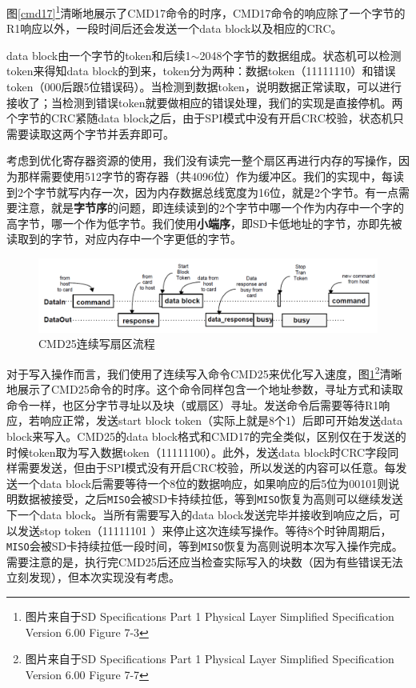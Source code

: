 \documentclass[11pt,utf8]{report}
\begin{document}
	\par 图\ref{cmd17}\footnote{图片来自于SD Specifications Part 1 Physical Layer Simplified Specification Version 6.00 Figure 7-3}清晰地展示了CMD17命令的时序，CMD17命令的响应除了一个字节的R1响应以外，一段时间后还会发送一个data block以及相应的CRC。
	
	\par data block由一个字节的token和后续1$\sim$2048个字节的数据组成。状态机可以检测token来得知data block的到来，token分为两种：数据token（11111110）和错误token（000后跟5位错误码）。当检测到数据token，说明数据正常读取，可以进行接收了；当检测到错误token就要做相应的错误处理，我们的实现是直接停机。两个字节的CRC紧随data block之后，由于SPI模式中没有开启CRC校验，状态机只需要读取这两个字节并丢弃即可。
	
	\par 考虑到优化寄存器资源的使用，我们没有读完一整个扇区再进行内存的写操作，因为那样需要使用512字节的寄存器（共4096位）作为缓冲区。我们的实现中，每读到2个字节就写内存一次，因为内存数据总线宽度为16位，就是2个字节。有一点需要注意，就是\textbf{字节序}的问题，即连续读到的2个字节中哪一个作为内存中一个字的高字节，哪一个作为低字节。我们使用\textbf{小端序}，即SD卡低地址的字节，亦即先被读取到的字节，对应内存中一个字更低的字节。
	
	\begin{figure}[h!]
		\centering
		\includegraphics[width=\textwidth]{cmd25}
		\caption{CMD25连续写扇区流程}
		\label{cmd25}
	\end{figure}
	
	\par 对于写入操作而言，我们使用了连续写入命令CMD25来优化写入速度，图\ref{cmd25}\footnote{图片来自于SD Specifications Part 1 Physical Layer Simplified Specification Version 6.00 Figure 7-7}清晰地展示了CMD25命令的时序。这个命令同样包含一个地址参数，寻址方式和读取命令一样，也区分字节寻址以及块（或扇区）寻址。发送命令后需要等待R1响应，若响应正常，发送start block token（实际上就是8个1）后即可开始发送data block来写入。CMD25的data block格式和CMD17的完全类似，区别仅在于发送的时候token取为写入数据token（11111100）。此外，发送data block时CRC字段同样需要发送，但由于SPI模式没有开启CRC校验，所以发送的内容可以任意。每发送一个data block后需要等待一个8位的数据响应，如果响应的后5位为00101则说明数据被接受，之后\texttt{MISO}会被SD卡持续拉低，等到\texttt{MISO}恢复为高则可以继续发送下一个data block。当所有需要写入的data block发送完毕并接收到响应之后，可以发送stop token（11111101 ）来停止这次连续写操作。等待8个时钟周期后，\texttt{MISO}会被SD卡持续拉低一段时间，等到\texttt{MISO}恢复为高则说明本次写入操作完成。需要注意的是，执行完CMD25后还应当检查实际写入的块数（因为有些错误无法立刻发现），但本次实现没有考虑。
	
\end{document}
